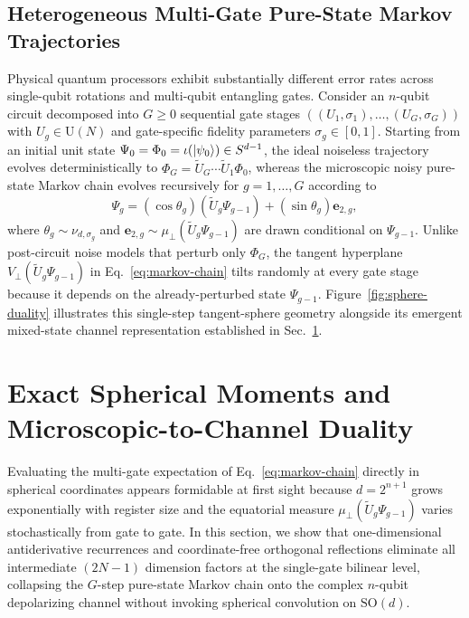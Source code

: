 

\subsection{Heterogeneous Multi-Gate Pure-State Markov Trajectories}
\label{sec:markov-model}

Physical quantum processors exhibit substantially different error rates across single-qubit rotations and multi-qubit entangling gates. Consider an $n$-qubit circuit decomposed into $G \ge 0$ sequential gate stages $((U_1, \sigma_1), \dots, (U_G, \sigma_G))$ with $U_g \in \mathrm{U}(N)$ and gate-specific fidelity parameters $\sigma_g \in [0, 1]$. Starting from an initial unit state $\Psi_0 = \Phi_0 = \iota(\ket{\psi_0}) \in S^{d-1}$, the ideal noiseless trajectory evolves deterministically to $\Phi_G = \widetilde{U}_G \cdots \widetilde{U}_1 \Phi_0$, whereas the microscopic noisy pure-state Markov chain evolves recursively for $g = 1, \dots, G$ according to
\begin{equation}
\Psi_g = (\cos\theta_g)(\widetilde{U}_g \Psi_{g-1}) + (\sin\theta_g)\mathbf{e}_{2,g},
\label{eq:markov-chain}
\end{equation}
where $\theta_g \sim \nu_{d,\sigma_g}$ and $\mathbf{e}_{2,g} \sim \mu_\perp(\widetilde{U}_g \Psi_{g-1})$ are drawn conditional on $\Psi_{g-1}$. Unlike post-circuit noise models that perturb only $\Phi_G$, the tangent hyperplane $V_\perp(\widetilde{U}_g \Psi_{g-1})$ in Eq.~\eqref{eq:markov-chain} tilts randomly at every gate stage because it depends on the already-perturbed state $\Psi_{g-1}$. Figure~\ref{fig:sphere-duality} illustrates this single-step tangent-sphere geometry alongside its emergent mixed-state channel representation established in Sec.~\ref{sec:theorems}.

\section{Exact Spherical Moments and Microscopic-to-Channel Duality}
\label{sec:theorems}

Evaluating the multi-gate expectation of Eq.~\eqref{eq:markov-chain} directly in spherical coordinates appears formidable at first sight because $d = 2^{n+1}$ grows exponentially with register size and the equatorial measure $\mu_\perp(\widetilde{U}_g \Psi_{g-1})$ varies stochastically from gate to gate. In this section, we show that one-dimensional antiderivative recurrences and coordinate-free orthogonal reflections eliminate all intermediate $(2N - 1)$ dimension factors at the single-gate bilinear level, collapsing the $G$-step pure-state Markov chain onto the complex $n$-qubit depolarizing channel without invoking spherical convolution on $\mathrm{SO}(d)$.

